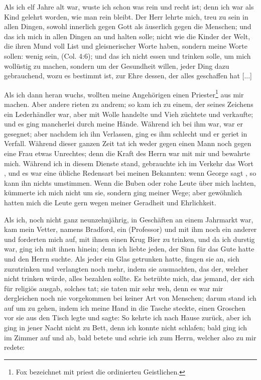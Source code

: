 Als ich elf Jahre alt war, wuste ich schon was rein und
recht ist; denn ich war als Kind gelehrt worden, wie man rein
bleibt. Der Herr lehrte mich, treu zu sein in allen Dingen, sowohl
innerlich gegen Gott als äuserlich gegen die Menschen; und das
ich mich in allen Dingen an  und  
halten solle; nicht
wie die Kinder der Welt, die ihren Mund voll List und gleisnerischer
Worte haben, sondern meine Worte sollen: wenig sein,  (Col. 4:6); 
und das ich nicht essen
und trinken solle, um mich wollüstig zu machen, sondern um der
Gesundheit willen, jeder Ding dazu gebrauchend, wozu es 
bestimmt ist, zur Ehre dessen, der alles geschaffen hat [...]

Als ich dann heran wuchs, wollten meine Angehörigen einen
Priester\footnote{Fox bezeichnet mit priest die ordinierteu Geistlichen.} 
aus mir machen. Aber andere rieten zu andrem; so
kam ich zu einem, der seines Zeichens ein Lederhändler war, aber
mit Wolle handelte und Vieh züchtete und verkaufte; und es ging
mancherlei durch meine Hände. Während ich bei ihm war,
war er gesegnet; aber nachdem ich ihn Verlassen, ging es ihm
schlecht und er geriet in Verfall. Während dieser ganzen Zeit
tat ich weder gegen einen Mann noch gegen eine Frau etwas
Unrechtes; denn die Kraft des Herrn war mit mir und bewahrte
mich. Während ich in diesem Dienste stand, gebrauchte ich im
Verkehr das Wort , und es war eine übliche Redensart
bei meinen Bekannten: wenn George sagt , so kann
ihn nichts umstimmen. Wenn die Buben oder rohe Leute über
mich lachten, kümmerte ich mich nicht um sie, sondern ging meiner
Wege; aber gewöhnlich hatten mich die Leute gern wegen meiner
Geradheit und Ehrlichkeit.

Als ich, noch nicht ganz neunzehnjährig, in Geschäften an
einem Jahrmarkt war, kam mein Vetter, namens 
Bradford, ein
 (Professor) und mit ihm noch ein anderer
 und forderten mich auf, mit ihnen 
einen Krug Bier zu trinken,
und da ich durstig war, ging ich mit ihnen hinein; denn ich
liebte jeden, der Sinn für das Gute hatte und den Herrn
suchte. Als jeder ein Glas getrunken hatte, fingen sie an, sich
zuzutrinken und verlangten noch mehr, indem sie ausmachten,
das der, welcher nicht trinken würde, alles bezahlen sollte.
 Es betrübte mich, das jemand, 
der sich für religiös ausgab, solches
tat; sie taten mir sehr weh, denn es war mir dergleichen noch
nie vorgekommen bei keiner Art von Menschen; darum stand ich
auf um zu gehen, indem ich meine Hand in die Tasche steckte,
einen Groschen vor sie aus den Tisch legte und sagte:  So kehrte ich nach Hause zurück,
aber ich ging in jener Nacht nicht zu Bett, denn ich konnte nicht
schlafen; bald ging ich im Zimmer auf und ab, bald betete und
schrie ich zum Herrn, welcher also zu mir redete: 

